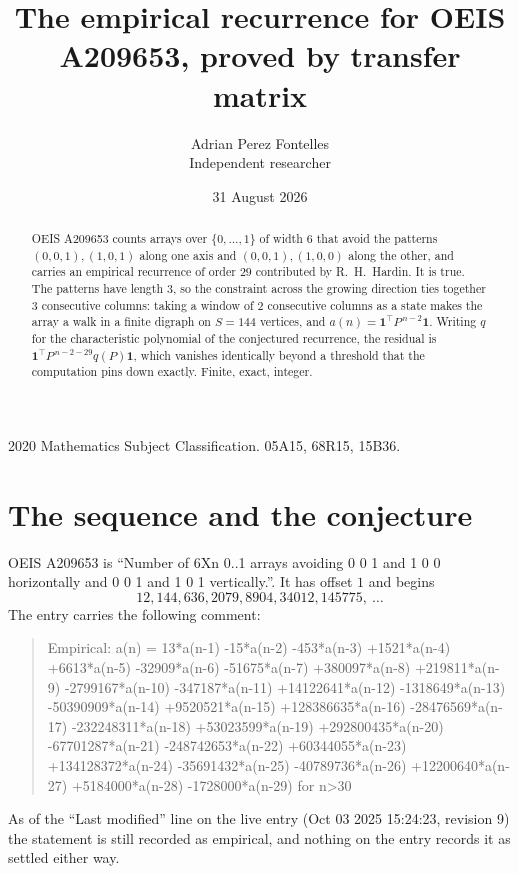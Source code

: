 \documentclass[11pt,a4paper]{article}
\title{The empirical recurrence for OEIS A209653, proved by transfer matrix}
\author{Adrian Perez Fontelles\\ \small Independent researcher}
\date{31 August 2026}
\theoremstyle{plain}
\theoremstyle{definition}
\begin{document}
\maketitle

\begin{abstract}
OEIS A209653 counts arrays over $\{0,\dots,1\}$ of width $6$ that avoid the patterns
$(0,0,1), (1,0,1)$ along one axis and $(0,0,1), (1,0,0)$ along the other, and carries an empirical recurrence of
order $29$ contributed by R.~H.~Hardin. It is true. The patterns have length $3$, so
the constraint across the growing direction ties together $3$ consecutive columns: taking a
window of $2$ consecutive columns as a state makes the array a walk in a finite digraph
on $S=144$ vertices, and $a(n)=\mathbf{1}^{\!\top}P^{\,n-2}\mathbf{1}$. Writing $q$
for the characteristic polynomial of the conjectured recurrence, the residual is
$\mathbf{1}^{\!\top}P^{\,n-2-29}q(P)\mathbf{1}$, which vanishes identically
beyond a threshold that the computation pins down exactly. Finite, exact, integer.
\end{abstract}

\noindent\small 2020 Mathematics Subject Classification. 05A15, 68R15, 15B36.\normalsize

\section{The sequence and the conjecture}

OEIS A209653 is ``Number of 6Xn 0..1 arrays avoiding 0 0 1 and 1 0 0 horizontally and 0 0 1 and 1 0 1 vertically.''. It has offset
$1$ and begins
\[
12, 144, 636, 2079, 8904, 34012, 145775,\ \dots
\]
The entry carries the following comment:
\begin{quote}\small
Empirical: a(n) = 13*a(n-1) -15*a(n-2) -453*a(n-3) +1521*a(n-4) +6613*a(n-5) -32909*a(n-6) -51675*a(n-7) +380097*a(n-8) +219811*a(n-9) -2799167*a(n-10) -347187*a(n-11) +14122641*a(n-12) -1318649*a(n-13) -50390909*a(n-14) +9520521*a(n-15) +128386635*a(n-16) -28476569*a(n-17) -232248311*a(n-18) +53023599*a(n-19) +292800435*a(n-20) -67701287*a(n-21) -248742653*a(n-22) +60344055*a(n-23) +134128372*a(n-24) -35691432*a(n-25) -40789736*a(n-26) +12200640*a(n-27) +5184000*a(n-28) -1728000*a(n-29) for n>30
\end{quote}
As of the ``Last modified'' line on the live entry (Oct 03 2025 15:24:23, revision
9) the statement is still recorded as empirical, and nothing on the entry
records it as settled either way.
\end{document}
